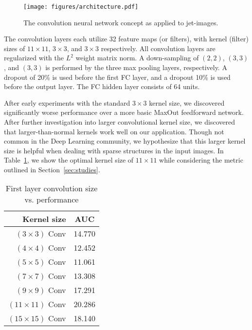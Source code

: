 \begin{figure}[!htbp]
  \centering
  \texttt{[image: figures/architecture.pdf]}
  \caption{The convolution neural network concept as applied to jet-images.}
  \label{fig:arch}
\end{figure}

The convolution layers each utilize 32 feature maps (or filters), with kernel (filter) sizes of $11\times 11$, $3\times 3$, and $3\times 3$ respectively.  All convolution layers are regularized with the $L^{2}$ weight matrix norm.  A down-sampling of $(2, 2)$, $(3, 3)$, and $(3, 3)$ is performed by the three max pooling layers, respectively.  A dropout of 20\% is used before the first FC layer, and a dropout 10\% is used before the output layer.  The FC hidden layer consists of 64 units.

After early experiments with the standard $3\times 3$ kernel size, we discovered significantly worse performance over a more basic MaxOut \cite{maxout:goodfellow} feedforward network. After further investigation into larger convolutional kernel size, we discovered that larger-than-normal kernels work well on our application. Though not common in the Deep Learning community, we hypothesize that this larger kernel size is helpful when dealing with sparse structures in the input images. In Table~\ref{tab:kernelsize}, we show the optimal kernel size of $11\times11$ while considering the metric outlined in Section~\ref{sec:studies}.

\begin{table}[h!]
  \centering
  \begin{tabular}{r|c}
    \bfseries Kernel size & \bfseries AUC \\ 
    \hline
    $(3 \times 3)$ Conv & 14.770 \\
    \hline
    $(4 \times 4)$ Conv & 12.452 \\
    \hline
    $(5 \times 5)$ Conv & 11.061 \\
    \hline
    $(7 \times 7)$ Conv & 13.308 \\
    \hline
    $(9 \times 9)$ Conv & 17.291 \\
    \hline
    $(11 \times 11)$ Conv & 20.286 \\
    \hline
    $(15 \times 15)$ Conv & 18.140 \\
  \end{tabular}
  \caption{First layer convolution size vs. performance}
  \label{tab:kernelsize}
\end{table}

